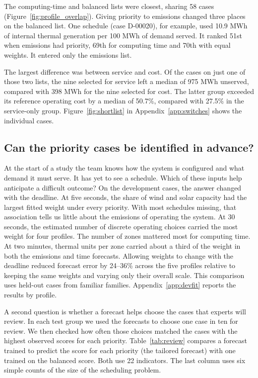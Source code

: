 \documentclass[11pt,a4paper]{article}
\begin{document}
The computing-time and balanced lists were closest, sharing 58 cases (Figure~\ref{fig:profile_overlap}). Giving priority to emissions changed three places on the balanced list. One schedule (case D-00020), for example, used 10.9 MWh of internal thermal generation per 100 MWh of demand served. It ranked 51st when emissions had priority, 69th for computing time and 70th with equal weights. It entered only the emissions list.

The largest difference was between service and cost. Of the cases on just one of those two lists, the nine selected for service left a median of 975 MWh unserved, compared with 398 MWh for the nine selected for cost. The latter group exceeded its reference operating cost by a median of 50.7\%, compared with 27.5\% in the service-only group. Figure~\ref{fig:shortlist} in Appendix~\ref{app:switches} shows the individual cases. 

\subsection{Can the priority cases be identified in advance?}
\label{sec:early}

At the start of a study the team knows how the system is configured and what demand it must serve. It has yet to see a schedule. Which of these inputs help anticipate a difficult outcome? On the development cases, the answer changed with the deadline. At five seconds, the share of wind and solar capacity had the largest fitted weight under every priority. With most schedules missing, that association tells us little about the emissions of operating the system. At 30 seconds, the estimated number of discrete operating choices carried the most weight for four profiles. The number of zones mattered most for computing time. At two minutes, thermal units per zone carried about a third of the weight in both the emissions and time forecasts. Allowing weights to change with the deadline reduced forecast error by 24--36\% across the five profiles relative to keeping the same weights and varying only their overall scale. This comparison uses held-out cases from familiar families. Appendix~\ref{app:devfit} reports the results by profile.

A second question is whether a forecast helps choose the cases that experts will review. In each test group we used the forecasts to choose one case in ten for review. We then checked how often those choices matched the cases with the highest observed scores for each priority. Table~\ref{tab:review} compares a forecast trained to predict the score for each priority (the tailored forecast) with one trained on the balanced score. Both use 22 indicators. The last column uses six simple counts of the size of the scheduling problem.
\end{document}
